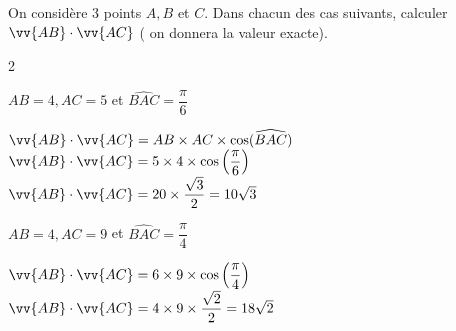 \documentclass[12pt,a4paper]{article}  %
\begin{document}
\graphicspath{{../images/}}

\begin{center}

\end{center}



%

\vspace{-.3cm} 
On considère 3 points $A, B$ et $C$. Dans chacun des cas suivants, calculer $\vv{A B} \cdot \vv{A C}$ ( on donnera la valeur exacte).
\begin{multicols}{2}
\begin{enumMet}
    \item $A B=4, A C=5$ et $\widehat{BAC}=\dfrac{\pi}{6}$\quad {}
    \begin{corrBox}
    	$\vv{A B} \cdot \vv{A C}=A B \times A C \times \cos (\widehat{B A C})$\\
    	$\vv{A B} \cdot \vv{AC}=5 \times 4 \times \cos \left(\dfrac{\pi}{6}\right)$\\
    	$\vv{A B} \cdot \vv{AC}=20 \times \dfrac{\sqrt{3}}{2}=10 \sqrt{3}$
    \end{corrBox}
    \item {} $A B=4, A C=9$ et $\widehat{BAC}=\dfrac{\pi}{4}$\quad {}
    \begin{corrBox}
    	$\vv{A B} \cdot \vv{A C}=6 \times 9 \times \cos \left(\dfrac{\pi}{4}\right)$\\
    	$\vv{A B} \cdot \vv{A C}=4 \times 9 \times \dfrac{\sqrt{2}}{2}=18 \sqrt{2}$
    \end{corrBox}
\end{enumMet}
\end{multicols}
\end{document}
